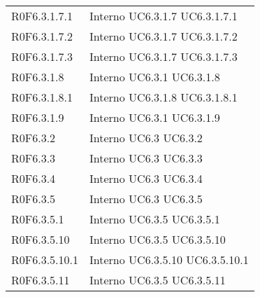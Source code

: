 \begin{longtable}{p{2.5cm}!{\VRule[1pt]}p{2.5cm}}
 \\
R0F6.3.1.7.1 & Interno \newline UC6.3.1.7
 \newline UC6.3.1.7.1
 \\
R0F6.3.1.7.2 & Interno \newline UC6.3.1.7
 \newline UC6.3.1.7.2
 \\
R0F6.3.1.7.3 & Interno \newline UC6.3.1.7
 \newline UC6.3.1.7.3
 \\
R0F6.3.1.8 & Interno \newline UC6.3.1
 \newline UC6.3.1.8
 \\
R0F6.3.1.8.1 & Interno \newline UC6.3.1.8
 \newline UC6.3.1.8.1
 \\
R0F6.3.1.9 & Interno \newline UC6.3.1
 \newline UC6.3.1.9
 \\
R0F6.3.2 & Interno \newline UC6.3
 \newline UC6.3.2
 \\
R0F6.3.3 & Interno \newline UC6.3
 \newline UC6.3.3
 \\
R0F6.3.4 & Interno \newline UC6.3
 \newline UC6.3.4
 \\
R0F6.3.5 & Interno \newline UC6.3
 \newline UC6.3.5
 \\
R0F6.3.5.1 & Interno \newline UC6.3.5
 \newline UC6.3.5.1
 \\
R0F6.3.5.10 & Interno \newline UC6.3.5
 \newline UC6.3.5.10
 \\
R0F6.3.5.10.1 & Interno \newline UC6.3.5.10
 \newline UC6.3.5.10.1
 \\
R0F6.3.5.11 & Interno \newline UC6.3.5
 \newline UC6.3.5.11
 \\

\end{longtable}
